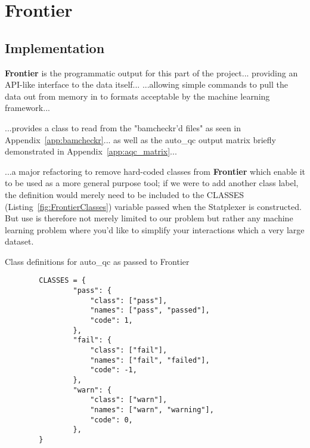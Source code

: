 \chapter{Frontier}
\ifpdf
    \graphicspath{{Chapter3/Figs/Raster/}{Chapter3/Figs/PDF/}{Chapter3/Figs/}}
\else
    \graphicspath{{Chapter3/Figs/Vector/}{Chapter3/Figs/}}
\fi

\section{Implementation}

\textbf{Frontier} is the programmatic output for this part of the project...
providing an API-like interface to the data itself... ...allowing simple
commands to pull the data out from memory in to formats acceptable by the machine
learning framework...

...provides a class to read from the "bamcheckr'd files" as seen in
Appendix~\ref{app:bamcheckr}... as well as the auto\_qc output matrix briefly
demonstrated in Appendix~\ref{app:aqc_matrix}...

...a major refactoring to remove hard-coded classes from \textbf{Frontier} which
enable it to be used as a more general purpose tool; if we were to add another
class label, the definition would merely need to be included to the CLASSES
(Listing~\ref{fig:FrontierClasses}) variable passed when the Statplexer is
constructed. But use is therefore not merely limited to our problem but rather
any machine learning problem where you'd like to simplify your interactions
which a very large dataset.

\begin{listing}[H]
    \caption[FrontierClasses]{Class definitions for auto\_qc as passed to Frontier}
    \label{fig:FrontierClasses}
    \begin{verbatim}
        CLASSES = {
                "pass": {
                    "class": ["pass"],
                    "names": ["pass", "passed"],
                    "code": 1,
                },
                "fail": {
                    "class": ["fail"],
                    "names": ["fail", "failed"],
                    "code": -1,
                },
                "warn": {
                    "class": ["warn"],
                    "names": ["warn", "warning"],
                    "code": 0,
                },
        }
    \end{verbatim}
\end{listing}



